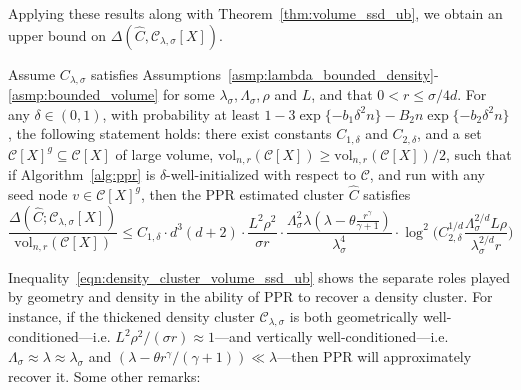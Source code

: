 \documentclass[11pt,twoside]{article}
\newcommand{\1}{\mathbf{1}}
\newcommand{\mc}[1]{\mathcal{#1}}
\newcommand{\wh}[1]{\widehat{#1}}
\newcommand{\vol}{\mathrm{vol}}
\begin{document}
\noindent Applying these results along with Theorem~\ref{thm:volume_ssd_ub}, we obtain an upper bound on $\Delta(\wh{C},\mc{C}_{\lambda,\sigma}[X])$.

\begin{corollary}
	\label{cor:density_cluster_volume_ssd_ub}
	Assume $C_{\lambda,\sigma}$ satisfies Assumptions~\ref{asmp:lambda_bounded_density}-\ref{asmp:bounded_volume} for some $\lambda_{\sigma}, \Lambda_{\sigma}, \rho$ and $L$, and that $0 < r \leq \sigma/4d$. For any $\delta \in (0,1)$, with probability at least $1 - 3\exp\{-b_1\delta^2 n\} - B_2n\exp\{-b_2\delta^2n\}$, the following statement holds: there exist constants $C_{1,\delta}$ and $C_{2,\delta}$, and a set $\mc{C}[X]^g \subseteq \mc{C}[X]$ of large volume, $\vol_{n,r}(\mc{C}[X]) \geq \vol_{n,r}(\mc{C}[X])/2$, such that if Algorithm~\ref{alg:ppr} is $\delta$-well-initialized with respect to $\mc{C}$, and run with any seed node $v \in \mc{C}[X]^g$, then the PPR estimated cluster $\wh{C}$ satisfies
	\begin{equation}
	\label{eqn:density_cluster_volume_ssd_ub}
	\frac{\Delta(\wh{C};\mc{C}_{\lambda,\sigma}[X])}{\vol_{n,r}(\mc{C}[X])} \leq C_{1,\delta} \cdot d^3(d + 2) \cdot \frac{L^2\rho^2}{\sigma r} \cdot \frac{\Lambda_{\sigma}^2 \lambda (\lambda - \theta \frac{r^{\gamma}}{\gamma + 1})}{\lambda_{\sigma}^4} \cdot \log^2\biggl(C_{2,\delta}^{1/d} \frac{\Lambda_{\sigma}^{2/d} L\rho}{\lambda_{\sigma}^{2/d}r}\biggr)
	\end{equation}
\end{corollary}
Inequality~\eqref{eqn:density_cluster_volume_ssd_ub} shows the separate roles played by geometry and density in the ability of PPR to recover a density cluster. For instance, if the thickened density cluster $\mc{C}_{\lambda,\sigma}$ is both geometrically well-conditioned---i.e. $L^2\rho^2/(\sigma r) \approx 1$---and vertically well-conditioned---i.e. $\Lambda_{\sigma} \approx \lambda \approx \lambda_{\sigma}$ and $(\lambda - \theta r^{\gamma}/(\gamma + 1)) \ll \lambda$---then PPR will approximately recover it.  Some other remarks:
\end{document}
